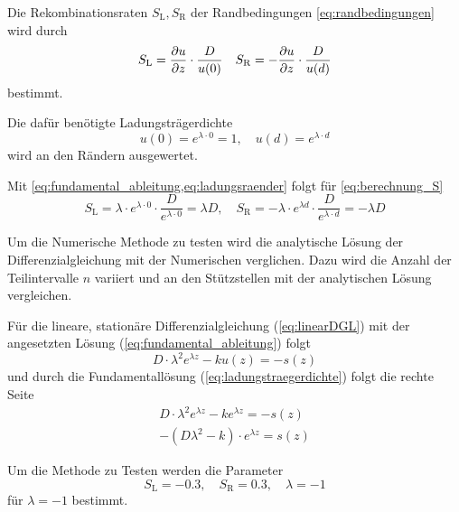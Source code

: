 Die Rekombinationsraten $S_\mathrm{L},S_\mathrm{R}$ der Randbedingungen
\cref{eq:randbedingungen} wird durch
\begin{equation}\label{eq:berechnung_S}
	S_\mathrm{L}=\pdv{u}{z}\cdot\frac{D}{u(0)} \quad
	S_\mathrm{R}=-\pdv{u}{z}\cdot \frac{D}{u(d)}
\end{equation}
bestimmt.

Die dafür benötigte Ladungsträgerdichte
\begin{equation}\label{eq:ladungsraender}
	u(0)=e^{\lambda \cdot 0}=1 , \quad u(d)=e^{\lambda \cdot d}
\end{equation}
 wird an den Rändern ausgewertet.
 
Mit \cref{eq:fundamental_ableitung,eq:ladungsraender} folgt für \cref{eq:berechnung_S}
\begin{equation}
	S_\mathrm{L}=\lambda \cdot e^{\lambda \cdot 0}\cdot \frac{D}{e^{\lambda \cdot 0}}=\lambda D,\quad	S_\mathrm{R}=-\lambda \cdot e^{\lambda d}\cdot\frac{D}{e^{\lambda \cdot d}}=-\lambda D
\end{equation} 





Um die Numerische Methode zu testen wird die analytische Lösung der Differenzialgleichung mit der Numerischen verglichen.
Dazu wird die Anzahl der Teilintervalle $n$ variiert und an den Stützstellen mit der analytischen Lösung vergleichen.

Für die lineare, stationäre Differenzialgleichung (\cref{eq:linearDGL}) mit der angesetzten Lösung (\cref{eq:fundamental_ableitung}) folgt
\begin{equation}
	D\cdot\lambda^2 e^{\lambda z}-ku(z)=-s(z)
\end{equation}
und durch die Fundamentallösung (\cref{eq:ladungstraegerdichte}) folgt die rechte Seite
\begin{equation}
	\begin{split}
		D\cdot\lambda^2 e^{\lambda z}-ke^{\lambda z}=-s(z) \\
		-\left(D\lambda^2-k\right)\cdot e^{\lambda z}=s(z)
	\end{split}
\end{equation}

Um die Methode zu Testen werden die Parameter
\begin{equation}
	S_\mathrm{L}=-0.3,\quad S_\mathrm{R}=0.3,\quad \lambda=-1
\end{equation}
 für $\lambda=-1$ bestimmt.
 
